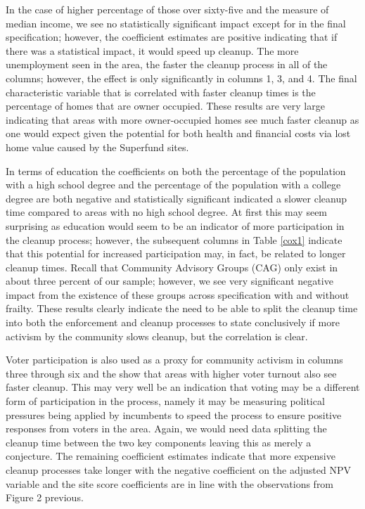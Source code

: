 \documentclass[12pt]{article}
\begin{document}
{In the case of higher percentage of those over sixty-five and the measure of median income, we see no statistically significant impact except for in the final specification; however, the coefficient estimates are positive indicating that if there was a statistical impact, it would speed up cleanup. The more unemployment seen in the area, the faster the cleanup process in all of the columns; however, the effect is only significantly in columns 1, 3, and 4. The final characteristic variable that is correlated with faster cleanup times is the percentage of homes that are owner occupied. These results are very large indicating that areas with more owner-occupied homes see much faster cleanup as one would expect given the potential for both health and financial costs via lost home value caused by the Superfund sites. 

In terms of education the coefficients on both the percentage of the population with a high school degree and the percentage of the population with a college degree are both negative and statistically significant indicated a slower cleanup time compared to areas with no high school degree. At first this may seem surprising as education would seem to be an indicator of more participation in the cleanup process; however, the subsequent columns in Table \ref{cox1} indicate that this potential for increased participation may, in fact, be related to longer cleanup times. Recall that Community Advisory Groups (CAG) only exist in about three percent of our sample; however, we see very significant negative impact from the existence of these groups across specification with and without frailty. These results clearly indicate the need to be able to split the cleanup time into both the enforcement and cleanup processes to state conclusively if more activism by the community slows cleanup, but the correlation is clear. 

Voter participation is also used as a proxy for community activism in columns three through six and the show that areas with higher voter turnout also see faster cleanup. This may very well be an indication that voting may be a different form of participation in the process, namely it may be measuring political pressures being applied by incumbents to speed the process to ensure positive responses from voters in the area. Again, we would need data splitting the cleanup time between the two key components leaving this as merely a conjecture. The remaining coefficient estimates indicate that more expensive cleanup processes take longer with the negative coefficient on the adjusted NPV variable and the site score coefficients are in line with the observations from Figure 2 previous. 

}
\end{document}

